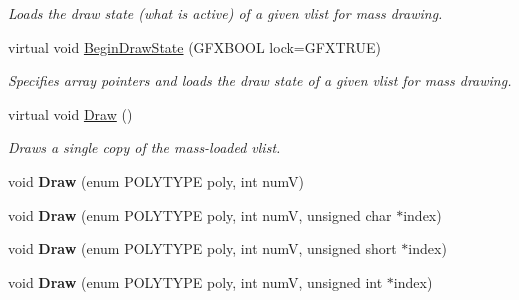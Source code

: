 \begin{DoxyCompactItemize}
\begin{DoxyCompactList}\small\item\em Loads the draw state (what is active) of a given vlist for mass drawing. \end{DoxyCompactList}\item 
virtual void \hyperlink{classGFXVertexList_adf3bac4d8b6c7c2941d046007a0bdaf5}{Begin\+Draw\+State} (G\+F\+X\+B\+O\+OL lock=G\+F\+X\+T\+R\+UE)\hypertarget{classGFXVertexList_adf3bac4d8b6c7c2941d046007a0bdaf5}{}\label{classGFXVertexList_adf3bac4d8b6c7c2941d046007a0bdaf5}

\begin{DoxyCompactList}\small\item\em Specifies array pointers and loads the draw state of a given vlist for mass drawing. \end{DoxyCompactList}\item 
virtual void \hyperlink{classGFXVertexList_a3b255f67295ad39da053bfac48af19ac}{Draw} ()\hypertarget{classGFXVertexList_a3b255f67295ad39da053bfac48af19ac}{}\label{classGFXVertexList_a3b255f67295ad39da053bfac48af19ac}

\begin{DoxyCompactList}\small\item\em Draws a single copy of the mass-\/loaded vlist. \end{DoxyCompactList}\item 
void {\bfseries Draw} (enum P\+O\+L\+Y\+T\+Y\+PE poly, int numV)\hypertarget{classGFXVertexList_a02d7a8d42ac6c63db2fd13e042c30201}{}\label{classGFXVertexList_a02d7a8d42ac6c63db2fd13e042c30201}

\item 
void {\bfseries Draw} (enum P\+O\+L\+Y\+T\+Y\+PE poly, int numV, unsigned char $\ast$index)\hypertarget{classGFXVertexList_a3021fa8f97d1f4bab4c3156e651a9772}{}\label{classGFXVertexList_a3021fa8f97d1f4bab4c3156e651a9772}

\item 
void {\bfseries Draw} (enum P\+O\+L\+Y\+T\+Y\+PE poly, int numV, unsigned short $\ast$index)\hypertarget{classGFXVertexList_a27d7f40bfc939090064ea9cba1e71796}{}\label{classGFXVertexList_a27d7f40bfc939090064ea9cba1e71796}

\item 
void {\bfseries Draw} (enum P\+O\+L\+Y\+T\+Y\+PE poly, int numV, unsigned int $\ast$index)\hypertarget{classGFXVertexList_ad0cdfb78e8720c2aa3166d522e43753e}{}\label{classGFXVertexList_ad0cdfb78e8720c2aa3166d522e43753e}


\end{DoxyCompactItemize}
